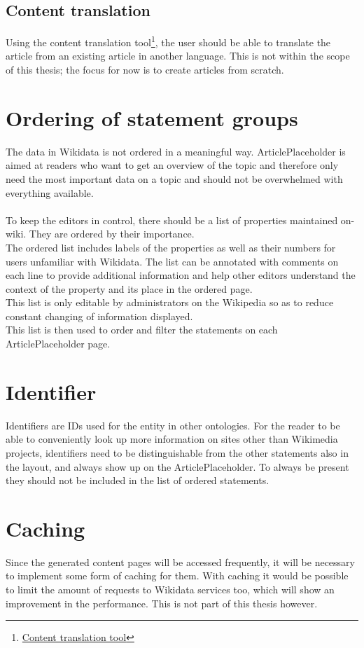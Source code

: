 \subsection{Content translation}
Using the content translation tool\footnote{\href{https://www.mediawiki.org/wiki/Content_translation}{Content translation tool}}, the user should be able to translate the article from an existing article in another language. This is not within the scope of this thesis; the focus for now is to create articles from scratch. \\

\section{Ordering of statement groups}
The data in Wikidata is not ordered in a meaningful way. ArticlePlaceholder is aimed at readers who want to get an overview of the topic and therefore only need the most important data on a topic and should not be overwhelmed with everything available. \\
\\
To keep the editors in control, there should be a list of properties maintained on-wiki. They are ordered by their importance. \\
The ordered list includes labels of the properties as well as their numbers for users unfamiliar with Wikidata. The list can be annotated with comments on each line to provide additional information and help other editors understand the context of the property and its place in the ordered page. \\
This list is only editable by administrators on the Wikipedia so as to reduce constant changing of information displayed. \\
This list is then used to order and filter the statements on each ArticlePlaceholder page. 

\section {Identifier}
Identifiers are IDs used for the entity in other ontologies. For the reader to be able to conveniently look up more information on sites other than Wikimedia projects, identifiers need to be distinguishable from the other statements also in the layout, and always show up on the ArticlePlaceholder. To always be present they should not be included in the list of ordered statements. 

\section{Caching}
Since the generated content pages will be accessed frequently,  it will be necessary to implement some form of caching for them. With caching it would be possible to limit the amount of requests to Wikidata services too, which will show an improvement in the performance. This is not part of this thesis however.


